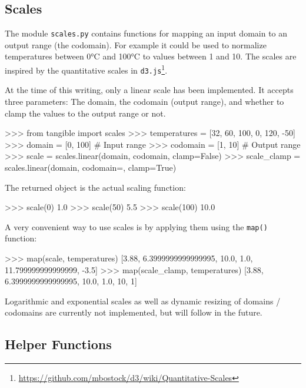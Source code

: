 \subsection{Scales}

The module \texttt{scales.py} contains functions for mapping an input domain to
an output range (the codomain). For example it could be used to normalize
temperatures between 0\si{\degree}C and 100\si{\degree}C to values between 1 and
10. The scales are inspired by the quantitative scales in
\texttt{d3.js}\footnote{\url{https://github.com/mbostock/d3/wiki/Quantitative-Scales}}.

At the time of this writing, only a linear scale has been implemented. It
accepts three parameters: The domain, the codomain (output range), and whether
to clamp the values to the output range or not.

\vspace{.5\baselineskip}
\begin{pythoncode}
>>> from tangible import scales
>>> temperatures = [32, 60, 100, 0, 120, -50]
>>> domain = [0, 100]  # Input range
>>> codomain = [1, 10]  # Output range
>>> scale = scales.linear(domain, codomain, clamp=False)
>>> scale_clamp = scales.linear(domain, codomain=, clamp=True)
\end{pythoncode}

\noindent The returned object is the actual scaling function:

\vspace{.5\baselineskip}
\begin{pythoncode}
>>> scale(0)
1.0
>>> scale(50)
5.5
>>> scale(100)
10.0
\end{pythoncode}

\noindent A very convenient way to use scales is by applying them using the
\texttt{map()} function:

\vspace{.5\baselineskip}
\begin{pythoncode}
>>> map(scale, temperatures)
[3.88, 6.3999999999999995, 10.0, 1.0, 11.799999999999999, -3.5]
>>> map(scale_clamp, temperatures)
[3.88, 6.3999999999999995, 10.0, 1.0, 10, 1]
\end{pythoncode}

\noindent Logarithmic and exponential scales as well as dynamic resizing of
domains / codomains are currently not implemented, but will follow in the
future.

\subsection{Helper Functions}

